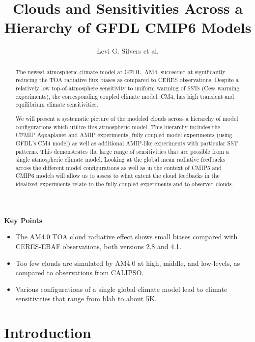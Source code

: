 \documentclass[11pt]{article}   	%
\title{Clouds and Sensitivities Across a Hierarchy of GFDL CMIP6 Models}
\author{Levi G. Silvers et al.}
\begin{document}
\maketitle

\begin{abstract}
The newest atmospheric climate model at GFDL, AM4, succeeded at significantly reducing the TOA radiative flux biases as compared to CERES observations.  Despite a relatively low top-of-atmosphere sensitivity to uniform warming of SSTs (Cess warming experiments), the corresponding coupled climate model, CM4, has high transient and equilibrium climate sensitivities.  

We will present a systematic picture of the modeled clouds across a hierarchy of model configurations which utilize this atmospheric model.  This hierarchy includes the CFMIP Aquaplanet and AMIP experiments, fully coupled model experiments (using GFDL's CM4 model) as well as additional AMIP-like experiments with particular SST patterns.  This demonstrates the large range of sensitivities that are possible from a single atmospheric climate model.   Looking at the global mean radiative feedbacks across the different model configurations as well as in the context of CMIP5 and CMIP6 models will allow us to assess to what extent the cloud feedbacks in the idealized experiments relate to the fully coupled experiments and to observed clouds.  
\end{abstract}


\textbf{Key Points}
\begin{itemize}
  \item{The AM4.0 TOA cloud radiative effect shows small biases compared with CERES-EBAF observations, both versions 
  2.8 and 4.1.}
  \item{Too few clouds are simulated by AM4.0 at high, middle, and low-levels, as compared to observations from CALIPSO.}
  \item{Various configurations of a single global climate model lead to climate sensitivities that range from blah to about 5K.}
\end{itemize}

\section{Introduction}
\end{document}
